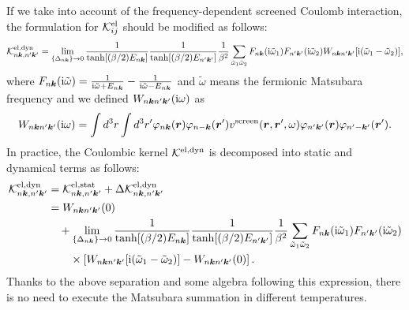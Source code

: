%
If we take into account of the frequency-dependent screened Coulomb interaction,
the formulation for ${\mathcal K}^{\rm el}_{ij}$ should be modified as follows\cite{ra2013}:
%
\begin{equation}
	{\mathcal K}^{\rm el, dyn}_{n\bm k,n'\bm k'} = 
	\lim_{\{\Delta_{n\bm k}\} \to 0}
	\frac{1}{\tanh[(\beta/2)E_{n\bm k}]}\frac{1}{\tanh[(\beta/2)E_{n'\bm k'}]}
	\frac{1}{\beta^2}
	\sum_{\tilde{\omega}_1\tilde{\omega}_2}
	F_{n\bm k}({\rm i}\tilde\omega_1)F_{n'\bm k'}({\rm i}\tilde\omega_2)
	W_{n\bm kn'\bm k'}[{\rm i}(\tilde\omega_1 - \tilde\omega_2)],
	\label{eq:Keldyn}
\end{equation}
%
where $F_{n\bm k}({\rm i}\tilde\omega) = 
\frac{1}{ {\rm i} \tilde\omega + E_{n\bm k}}-\frac{1}{ {\rm i} \tilde\omega - E_{n\bm k}}$
and $\tilde\omega$ means the fermionic Matsubara frequency and we defined 
$W_{n\bm kn'\bm k'}({\rm i}\omega)$ as 
%
\begin{equation}
	W_{n\bm kn'\bm k'}({\rm i}\omega) = 
	\int d^3r \int d^3r' \varphi_{n\bm k}(\bm r)\varphi_{n-\bm k}({\bm r'})
	v^{\rm screen}(\bm r, {\bm r'}, \omega) \varphi_{n'\bm k'}(\bm r) \varphi_{n'-\bm k'}({\bm r'}).
	\label{eq:dynWnknk}
\end{equation}
%
In practice, the Coulombic kernel $\mathcal K^{\rm el,dyn}$ is decomposed into static and dynamical
terms as follows\cite{RAphD}:
%
\begin{equation}
	\begin{split}
	{\mathcal K}^{\rm el, dyn}_{n\bm k,n'\bm k'} &={\mathcal K}^{\rm el,stat}_{n\bm k,n'\bm k'} 
	+ \Delta{\mathcal K}^{\rm el, dyn}_{n\bm k,n'\bm k'} \\
	&= W_{n\bm k n' \bm k'}(0)  \\
	&\quad +
	\lim_{\{\Delta_{n\bm k}\} \to 0}
	\frac{1}{\tanh[(\beta/2)E_{n\bm k}]}\frac{1}{\tanh[(\beta/2)E_{n'\bm k'}]}
	\frac{1}{\beta^2}
	\sum_{\tilde{\omega}_1\tilde{\omega}_2}
	F_{n\bm k}({\rm i}\tilde\omega_1)F_{n'\bm k'}({\rm i}\tilde\omega_2) \\
	&\quad \quad \times
	\left[ 
		W_{n\bm kn'\bm k'}[{\rm i}(\tilde\omega_1 - \tilde\omega_2)] - W_{n\bm k n' \bm k'}(0)
	\right].
	\label{eq:Kelsep}
\end{split}
\end{equation}
%
Thanks to the above separation and some algebra following this expression, 
there is no need to execute the Matsubara summation in different temperatures\cite{RAphD}.
